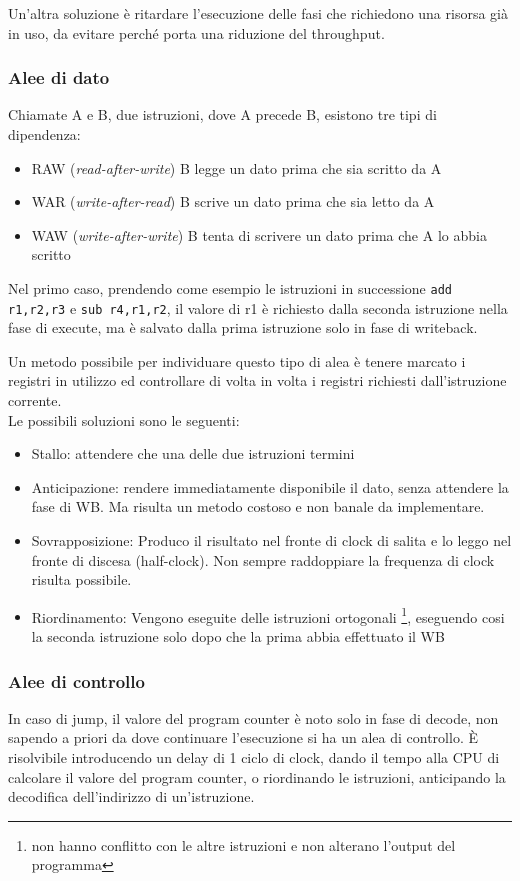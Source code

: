 \documentclass[../template]{subfiles}
\begin{document}
Un'altra soluzione è ritardare l'esecuzione delle fasi che richiedono una risorsa già in uso, da evitare perché porta una riduzione del throughput.

\subsubsection{Alee di dato}
Chiamate A e B, due istruzioni, dove A precede B, esistono tre tipi di dipendenza:
\begin{itemize}
    \item RAW (\textit{read-after-write}) B legge un dato prima che sia scritto da A
    \item WAR (\textit{write-after-read}) B scrive un dato prima che sia letto da A
    \item WAW (\textit{write-after-write}) B tenta di scrivere un dato prima che A lo abbia scritto
\end{itemize}
Nel primo caso, prendendo come esempio le istruzioni in successione \lstinline{add r1,r2,r3} e \lstinline{sub r4,r1,r2},
il valore di r1 è richiesto dalla seconda istruzione nella fase di execute, ma è salvato dalla prima istruzione solo in fase di writeback.

Un metodo possibile per individuare questo tipo di alea è tenere marcato i registri in utilizzo ed controllare di volta in volta i registri richiesti dall'istruzione corrente.
\\
Le possibili soluzioni sono le seguenti:
\begin{itemize}
    \item Stallo: attendere che una delle due istruzioni termini
    \item Anticipazione: rendere immediatamente disponibile il dato, senza attendere la fase di WB. Ma risulta un metodo
        costoso e non banale da implementare.
    \item Sovrapposizione:
        Produco il risultato nel fronte di clock di salita e lo leggo nel fronte di discesa (half-clock).
        Non sempre raddoppiare la frequenza di clock risulta possibile.
    \item Riordinamento: Vengono eseguite delle istruzioni ortogonali \footnote{non hanno conflitto con le altre
        istruzioni e non alterano l'output del programma}, eseguendo cosi la seconda istruzione solo dopo che la prima abbia effettuato il WB
\end{itemize}

\subsubsection{Alee di controllo}
In caso di jump, il valore del program counter è noto solo in fase di decode, non sapendo a priori da dove continuare l'esecuzione si ha un alea di controllo.
È risolvibile introducendo un delay di 1 ciclo di clock, dando il tempo alla CPU di calcolare il valore del program counter, o riordinando le istruzioni, anticipando la decodifica dell'indirizzo di un'istruzione.
\end{document}
